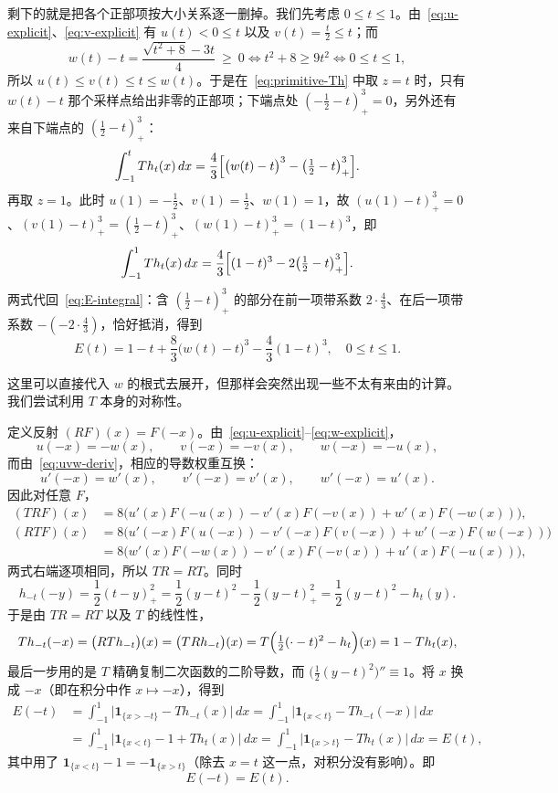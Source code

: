\documentclass[UTF8,fontset=windows,a4paper,11pt]{ctexart}
\begin{document}
剩下的就是把各个正部项按大小关系逐一删掉。我们先考虑 $0\le t\le1$。由~\eqref{eq:u-explicit}、\eqref{eq:v-explicit} 有 $u(t)<0\le t$ 以及 $v(t)=\frac{t}{2}\le t$；而
\[
    w(t)-t=\frac{\sqrt{t^2+8}-3t}{4}\ \ge\ 0
    \iff t^2+8\ge 9t^2
    \iff 0\le t\le1,
\]
所以 $u(t)\le v(t)\le t\le w(t)$。于是在~\eqref{eq:primitive-Th} 中取 $z=t$ 时，只有 $w(t)-t$ 那个采样点给出非零的正部项；下端点处 $(-\frac12-t)_+^3=0$，另外还有来自下端点的 $(\frac12-t)_+^3$：
\[
    \int_{-1}^{t}Th_t(x)\,dx
    =\frac43\Bigl[\bigl(w(t)-t\bigr)^3-\bigl(\tfrac12-t\bigr)_+^3\Bigr].
\]
再取 $z=1$。此时 $u(1)=-\frac12$、$v(1)=\frac12$、$w(1)=1$，故 $(u(1)-t)_+^3=0$、$(v(1)-t)_+^3=(\frac12-t)_+^3$、$(w(1)-t)_+^3=(1-t)^3$，即
\[
    \int_{-1}^{1}Th_t(x)\,dx
    =\frac43\Bigl[(1-t)^3-2\bigl(\tfrac12-t\bigr)_+^3\Bigr].
\]
两式代回~\eqref{eq:E-integral}：含 $(\frac12-t)_+^3$ 的部分在前一项带系数 $2\cdot\frac43$、在后一项带系数 $-(-2\cdot\frac43)$，恰好抵消，得到
\begin{equation}
    E(t)=1-t+\frac83\bigl(w(t)-t\bigr)^3-\frac43(1-t)^3,
    \quad 0\le t\le1.
    \label{eq:E-positive}
\end{equation}

这里可以直接代入 $w$ 的根式去展开，但那样会突然出现一些不太有来由的计算。我们尝试利用 $T$ 本身的对称性。

定义反射 $(RF)(x)=F(-x)$。由~\eqref{eq:u-explicit}--\eqref{eq:w-explicit}，
\[
    u(-x)=-w(x),\qquad v(-x)=-v(x),\qquad w(-x)=-u(x),
\]
而由~\eqref{eq:uvw-deriv}，相应的导数权重互换：
\[
    u'(-x)=w'(x),\qquad v'(-x)=v'(x),\qquad w'(-x)=u'(x).
\]
因此对任意 $F$，
\begin{align*}
    (TRF)(x)&=8\bigl(u'(x)F(-u(x))-v'(x)F(-v(x))+w'(x)F(-w(x))\bigr),\\
    (RTF)(x)&=8\bigl(u'(-x)F(u(-x))-v'(-x)F(v(-x))+w'(-x)F(w(-x))\bigr)\\
    &=8\bigl(w'(x)F(-w(x))-v'(x)F(-v(x))+u'(x)F(-u(x))\bigr),
\end{align*}
两式右端逐项相同，所以 $TR=RT$。同时
\[
    h_{-t}(-y)=\frac12(t-y)_+^2=\frac12(y-t)^2-\frac12(y-t)_+^2=\frac12(y-t)^2-h_t(y).
\]
于是由 $TR=RT$ 以及 $T$ 的线性性，
\[
    Th_{-t}(-x)=\bigl(RTh_{-t}\bigr)(x)=\bigl(TRh_{-t}\bigr)(x)
    =T\Bigl(\tfrac12(\cdot-t)^2-h_t\Bigr)(x)=1-Th_t(x),
\]
最后一步用的是 $T$ 精确复制二次函数的二阶导数，而 $\bigl(\frac12(y-t)^2\bigr)''\equiv1$。将 $x$ 换成 $-x$（即在积分中作 $x\mapsto -x$），得到
\begin{align*}
    E(-t)&=\int_{-1}^{1}\bigl|\mathbf1_{\{x>-t\}}-Th_{-t}(x)\bigr|\,dx
    =\int_{-1}^{1}\bigl|\mathbf1_{\{x<t\}}-Th_{-t}(-x)\bigr|\,dx\\
    &=\int_{-1}^{1}\bigl|\mathbf1_{\{x<t\}}-1+Th_t(x)\bigr|\,dx
    =\int_{-1}^{1}\bigl|\mathbf1_{\{x>t\}}-Th_t(x)\bigr|\,dx
    =E(t),
\end{align*}
其中用了 $\mathbf1_{\{x<t\}}-1=-\mathbf1_{\{x>t\}}$（除去 $x=t$ 这一点，对积分没有影响）。即
\begin{equation}
    E(-t)=E(t).
    \label{eq:E-even}
\end{equation}
\end{document}
